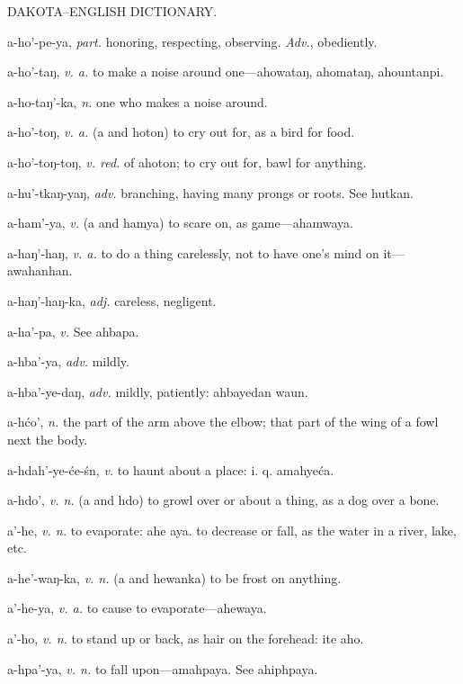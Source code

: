 \documentclass{article}
\begin{document}
 \hfill DAKOTA--ENGLISH DICTIONARY.

\vspace{0.5cm}

\noindent a-ho'-pe-ya, \textit{part.} honoring, respecting, observing. \textit{Adv.}, obediently.

\noindent a-ho'-taŋ, \textit{v. a.} to make a noise around one—ahowataŋ, ahomataŋ, ahountanpi.

\noindent a-ho-taŋ'-ka, \textit{n.} one who makes a noise around.

\noindent a-ho'-toŋ, \textit{v. a.} (a and hoton) to cry out for, as a bird for food.

\noindent a-ho'-toŋ-toŋ, \textit{v. red.} of ahoton; to cry out for, bawl for anything.

\noindent a-hu'-tkaŋ-yaŋ, \textit{adv.} branching, having many prongs or roots. See hutkan.

\noindent a-ham'-ya, \textit{v.} (a and hamya) to scare on, as game—ahamwaya.

\noindent a-haŋ'-haŋ, \textit{v. a.} to do a thing carelessly, not to have one's mind on it—awahanhan.

\noindent a-haŋ'-haŋ-ka, \textit{adj.} careless, negligent.

\noindent a-ha'-pa, \textit{v.} See ahbapa.

\noindent a-hba'-ya, \textit{adv.} mildly.

\noindent a-hba'-ye-daŋ, \textit{adv.} mildly, patiently: ahbayedan waun.

\noindent a-hćo', \textit{n.} the part of the arm above the elbow; that part of the wing of a fowl next the body.

\noindent a-hdah'-ye-će-śn, \textit{v.} to haunt about a place: i. q. amahyeća.

\noindent a-hdo', \textit{v. n.} (a and hdo) to growl over or about a thing, as a dog over a bone.

\noindent a'-he, \textit{v. n.} to evaporate: ahe aya. to decrease or fall, as the water in a river, lake, etc.

\noindent a-he'-waŋ-ka, \textit{v. n.} (a and hewanka) to be frost on anything.

\noindent a'-he-ya, \textit{v. a.} to cause to evaporate—ahewaya.

\noindent a'-ho, \textit{v. n.} to stand up or back, as hair on the forehead: ite aho.

\noindent a-hpa'-ya, \textit{v. n.} to fall upon—amahpaya. See ahiphpaya.
\end{document}
